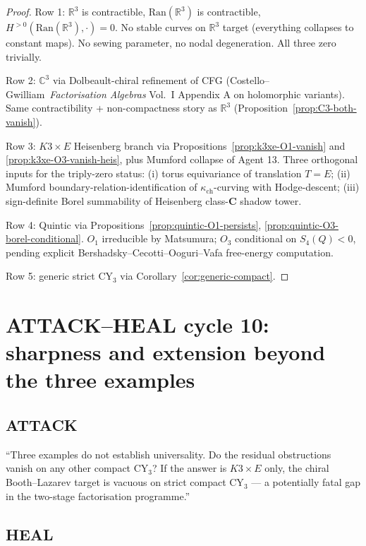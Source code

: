 \documentclass[11pt]{amsart}
\newcommand{\kch}{\kappa_{\mathrm{ch}}}
\newcommand{\Ran}{\mathrm{Ran}}
\newcommand{\bC}{\mathbb{C}}
\newcommand{\bR}{\mathbb{R}}
\begin{document}
\begin{proof}
Row 1: $\bR^3$ is contractible, $\Ran(\bR^3)$ is contractible,
$H^{>0}(\Ran(\bR^3), \cdot) = 0$. No stable curves on $\bR^3$ target
(everything collapses to constant maps). No sewing parameter, no
nodal degeneration. All three zero trivially.

Row 2: $\bC^3$ via Dolbeault-chiral refinement of CFG
(Costello--Gwilliam~\emph{Factorisation Algebras} Vol.~I Appendix A
on holomorphic variants). Same contractibility + non-compactness
story as $\bR^3$ (Proposition~\ref{prop:C3-both-vanish}).

Row 3: $K3 \times E$ Heisenberg branch via
Propositions~\ref{prop:k3xe-O1-vanish} and
\ref{prop:k3xe-O3-vanish-heis}, plus Mumford collapse of Agent 13.
Three orthogonal inputs for the triply-zero status:
(i) torus equivariance of translation $T = E$;
(ii) Mumford boundary-relation-identification of $\kch$-curving
with Hodge-descent;
(iii) sign-definite Borel summability of Heisenberg class-$\mathbf{C}$
shadow tower.

Row 4: Quintic via
Propositions~\ref{prop:quintic-O1-persists},
\ref{prop:quintic-O3-borel-conditional}. $O_1$ irreducible by
Matsumura; $O_3$ conditional on $S_4(Q) < 0$, pending explicit
Bershadsky--Cecotti--Ooguri--Vafa free-energy computation.

Row 5: generic strict CY$_3$ via Corollary~\ref{cor:generic-compact}.
\end{proof}

\section{ATTACK--HEAL cycle 10: sharpness and extension beyond the
three examples}
\label{sec:cycle-10-sharpness}

\subsection*{ATTACK}

``Three examples do not establish universality. Do the residual
obstructions vanish on any other compact CY$_3$? If the answer is
$K3 \times E$ only, the chiral Booth--Lazarev target is vacuous on
strict compact CY$_3$ --- a potentially fatal gap in the
two-stage factorisation programme.''

\subsection*{HEAL}
\end{document}
